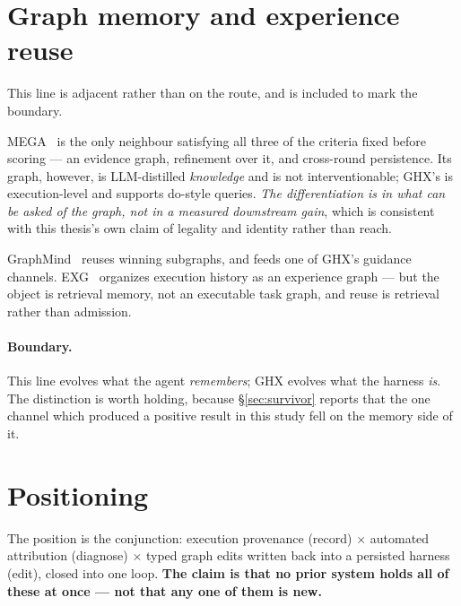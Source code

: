 \section{Graph memory and experience reuse}
\label{sec:graph-memory}

This line is adjacent rather than on the route, and is included to mark the
boundary.

MEGA~\cite{mega} is the only neighbour satisfying all three of the criteria
fixed before scoring --- an evidence graph, refinement over it, and
cross-round persistence. Its graph, however, is LLM-distilled
\emph{knowledge} and is not interventionable; GHX's is execution-level and
supports do-style queries. \emph{The differentiation is in what can be
asked of the graph, not in a measured downstream gain}, which is consistent
with this thesis's own claim of legality and identity rather than reach.

GraphMind~\cite{graphmind} reuses winning subgraphs, and feeds one of GHX's
guidance channels. EXG~\cite{exg} organizes execution history as an
experience graph --- but the object is retrieval memory, not an executable
task graph, and reuse is retrieval rather than admission.

\paragraph{Boundary.} This line evolves what the agent \emph{remembers};
GHX evolves what the harness \emph{is}. The distinction is worth holding,
because \S\ref{sec:survivor} reports that the one channel which produced a
positive result in this study fell on the memory side of it.

\section{Positioning}
\label{sec:positioning}

The position is the conjunction: execution provenance (record) $\times$
automated attribution (diagnose) $\times$ typed graph edits written back
into a persisted harness (edit), closed into one loop. \textbf{The claim is
that no prior system holds all of these at once --- not that any one of
them is new.}

